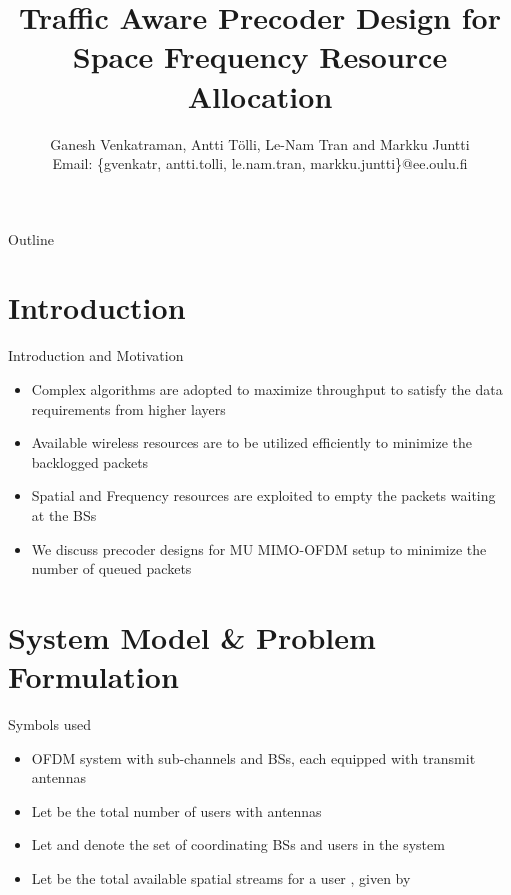 \documentclass[9pt]{beamer}
\title{Traffic Aware Precoder Design for Space Frequency Resource Allocation}
\author{{Ganesh Venkatraman, Antti T\"{o}lli\eqn{^\dagger}, Le-Nam Tran and Markku Juntti} \\ \scriptsize{Email: \{gvenkatr, antti.tolli, le.nam.tran, markku.juntti\}@ee.oulu.fi}}
\begin{document}
\AtBeginSection{\frame{\sectionpage}}

\begin{frame}
    \titlepage
\end{frame}

\begin{frame}{Outline} \scriptsize
    \tableofcontents
\end{frame}

  

\section{Introduction}

\begin{frame}{Introduction and Motivation}
\begin{itemize}
\item Complex algorithms are adopted to maximize throughput to satisfy the data requirements from higher layers
\item Available wireless resources are to be utilized efficiently to minimize the backlogged packets 
\item Spatial and Frequency resources are exploited to empty the packets waiting at the \acp{BS}
\item We discuss precoder designs for \acl{MU} \acs{MIMO}-\acs{OFDM} setup to minimize the number of queued packets 
\end{itemize}
\end{frame}

\section{System Model \& Problem Formulation}

\begin{frame}{Symbols used}
\begin{itemize}
\item \acs{OFDM} system with  sub-channels and  \acp{BS}, each equipped with  transmit antennas
\item Let  be the total number of users with  antennas
\item Let  and  denote the set of coordinating \acp{BS} and users in the system
\item Let  be the total available spatial streams for a user , given by 
\end{itemize}
\end{frame}
\end{document}
